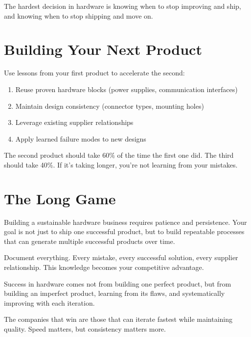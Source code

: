 The hardest decision in hardware is knowing when to stop improving and ship, and knowing when to stop shipping and move on.

\section{Building Your Next Product}

Use lessons from your first product to accelerate the second:

\begin{enumerate}
\item Reuse proven hardware blocks (power supplies, communication interfaces)
\item Maintain design consistency (connector types, mounting holes)
\item Leverage existing supplier relationships
\item Apply learned failure modes to new designs
\end{enumerate}

The second product should take 60\% of the time the first one did. The third should take 40\%. If it's taking longer, you're not learning from your mistakes.

\section{The Long Game}

Building a sustainable hardware business requires patience and persistence. Your goal is not just to ship one successful product, but to build repeatable processes that can generate multiple successful products over time.

Document everything. Every mistake, every successful solution, every supplier relationship. This knowledge becomes your competitive advantage.

Success in hardware comes not from building one perfect product, but from building an imperfect product, learning from its flaws, and systematically improving with each iteration.

The companies that win are those that can iterate fastest while maintaining quality. Speed matters, but consistency matters more.